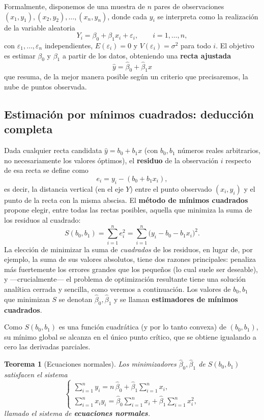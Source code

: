 \documentclass[11pt,a4paper]{article}
\theoremstyle{plain}
\newtheorem{teorema}{Teorema}[section]
\theoremstyle{definition}
\theoremstyle{remark}
\begin{document}
Formalmente, disponemos de una muestra de $n$ pares de observaciones $(x_1,y_1),(x_2,y_2),\dots,(x_n,y_n)$, donde cada $y_i$ se interpreta como la realización de la variable aleatoria
\[
Y_i = \beta_0+\beta_1 x_i + \varepsilon_i, \qquad i=1,\dots,n,
\]
con $\varepsilon_1,\dots,\varepsilon_n$ independientes, $E(\varepsilon_i)=0$ y $V(\varepsilon_i)=\sigma^2$ para todo $i$. El objetivo es estimar $\beta_0$ y $\beta_1$ a partir de los datos, obteniendo una \textbf{recta ajustada}
\[
\hat y = \hat\beta_0+\hat\beta_1 x
\]
que resuma, de la mejor manera posible según un criterio que precisaremos, la nube de puntos observada.

\subsection{Estimación por mínimos cuadrados: deducción completa}

Dada cualquier recta candidata $\hat y = b_0+b_1 x$ (con $b_0,b_1$ números reales arbitrarios, no necesariamente los valores óptimos), el \textbf{residuo} de la observación $i$ respecto de esa recta se define como
\[
e_i = y_i - (b_0+b_1 x_i),
\]
es decir, la distancia vertical (en el eje $Y$) entre el punto observado $(x_i,y_i)$ y el punto de la recta con la misma abscisa. El \textbf{método de mínimos cuadrados} propone elegir, entre todas las rectas posibles, aquella que minimiza la suma de los residuos al cuadrado:
\[
S(b_0,b_1) = \sum_{i=1}^n e_i^2 = \sum_{i=1}^n \big(y_i-b_0-b_1 x_i\big)^2.
\]
La elección de minimizar la suma de \emph{cuadrados} de los residuos, en lugar de, por ejemplo, la suma de sus valores absolutos, tiene dos razones principales: penaliza más fuertemente los errores grandes que los pequeños (lo cual suele ser deseable), y —crucialmente— el problema de optimización resultante tiene una solución analítica cerrada y sencilla, como veremos a continuación. Los valores de $b_0,b_1$ que minimizan $S$ se denotan $\hat\beta_0,\hat\beta_1$ y se llaman \textbf{estimadores de mínimos cuadrados}.

Como $S(b_0,b_1)$ es una función cuadrática (y por lo tanto convexa) de $(b_0,b_1)$, su mínimo global se alcanza en el único punto crítico, que se obtiene igualando a cero las derivadas parciales.

\begin{teorema}[Ecuaciones normales]
Los minimizadores $\hat\beta_0,\hat\beta_1$ de $S(b_0,b_1)$ satisfacen el sistema
\[
\begin{cases}
\displaystyle \sum_{i=1}^n y_i = n\,\hat\beta_0 + \hat\beta_1\sum_{i=1}^n x_i, \\[6pt]
\displaystyle \sum_{i=1}^n x_iy_i = \hat\beta_0\sum_{i=1}^n x_i + \hat\beta_1 \sum_{i=1}^n x_i^2,
\end{cases}
\]
llamado el sistema de \textbf{ecuaciones normales}.
\end{teorema}
\end{document}
